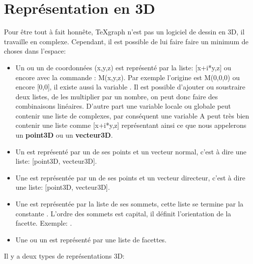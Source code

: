 \chapter{Représentation en 3D}


Pour être tout à fait honnête, TeXgraph n'est pas un logiciel de dessin en 3D, il travaille en complexe. Cependant, il est possible de lui faire faire un minimum de choses dans l'espace:

\begin{itemize}
 \item Un  ou un  de coordonnées (x,y,z) est représenté par la liste: [x+i*y,z] ou encore avec la commande : M(x,y,z). Par exemple l'origine est M(0,0,0) ou encore [0,0], il existe aussi la variable . Il est possible d'ajouter ou soustraire deux listes, de les multiplier par un nombre, on peut donc faire des combinaisons linéaires. D'autre part une variable locale ou globale peut contenir une liste de complexes, par conséquent une variable A peut très bien contenir une liste comme [x+i*y,z] représentant ainsi ce que nous appelerons un \textbf{point3D} ou un \textbf{vecteur3D}.
 \item Un  est représenté par un de ses points et un vecteur normal, c'est à dire une liste: [point3D, vecteur3D].
 \item Une  est représentée par un de ses points et un vecteur directeur, c'est à dire une liste: [point3D, vecteur3D].
 \item Une  est représentée par la liste de ses sommets, cette liste se termine par la constante \jump. L'ordre des sommets est capital, il définit l'orientation de la facette. Exemple: .
 \item Une  ou un  est représenté par une liste de facettes.
\end{itemize}

Il y a deux types de représentations 3D:

